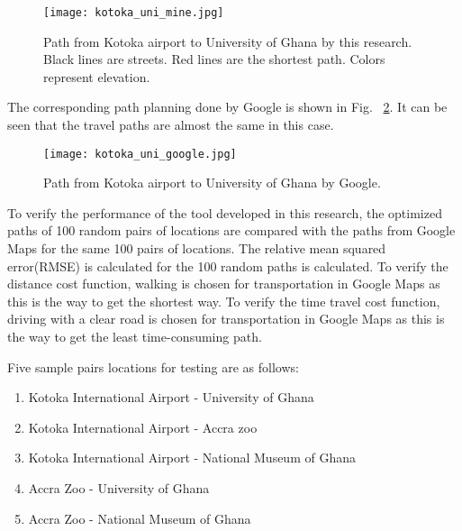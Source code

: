 \documentclass[final-report]{report-template}
\begin{document}
\begin{figure}[H]
    \centering
    \texttt{[image: kotoka\_uni\_mine.jpg]}
    \caption{\label{fig: mine} Path from Kotoka airport to University of Ghana by this research. Black lines are streets. Red lines are the shortest path. Colors represent elevation.}
\end{figure}
The corresponding path planning done by Google is shown in Fig. ~\ref{fig: google}. 
It can be seen that the travel paths are almost the same in this case.
\begin{figure}[H]
    \centering
    \texttt{[image: kotoka\_uni\_google.jpg]}
    \caption{\label{fig: google} Path from Kotoka airport to University of Ghana by Google.}
\end{figure}

To verify the performance of the tool developed in this research, 
the optimized paths of 100 random pairs of locations are compared with the paths from Google Maps for the same 100 pairs of locations.
The relative mean squared error(RMSE) is calculated for the 100 random paths is calculated.
To verify the distance cost function, walking is chosen for transportation in Google Maps as this is the way to get the shortest way.
To verify the time travel cost function, driving with a clear road is chosen for transportation in Google Maps as this is the way to get the least time-consuming path.

Five sample pairs locations for testing are as follows:
\begin{enumerate}
    \item Kotoka International Airport - University of Ghana
    \item Kotoka International Airport - Accra zoo
    \item Kotoka International Airport - National Museum of Ghana
    \item Accra Zoo - University of Ghana
    \item Accra Zoo - National Museum of Ghana
\end{enumerate}
\end{document}
